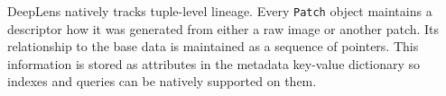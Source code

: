 \textsf{DeepLens} natively tracks tuple-level lineage.
Every \texttt{Patch} object maintains a descriptor how it was generated from either a raw image or another patch.
Its relationship to the base data is maintained as a sequence of pointers.
This information is stored as attributes in the metadata key-value dictionary so indexes and queries can be natively supported on them.

